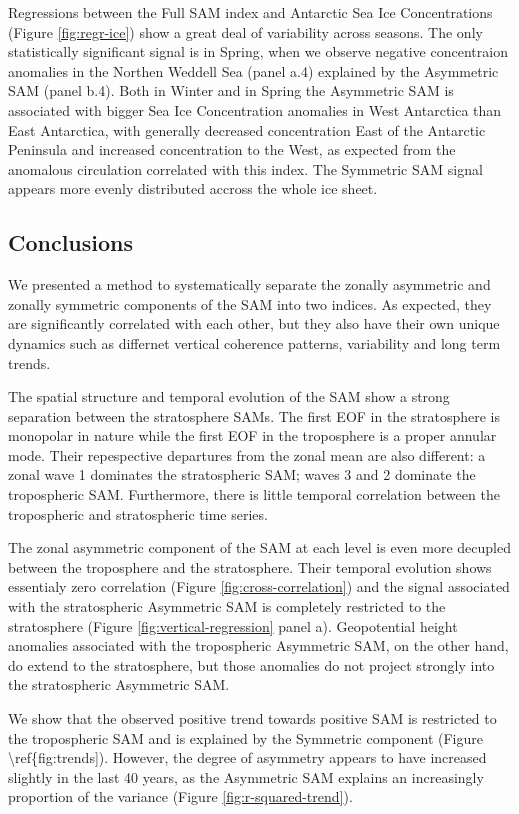 \documentclass[]{ametsocV5}
\begin{document}
Regressions between the Full SAM index and Antarctic Sea Ice
Concentrations (Figure \ref{fig:regr-ice}) show a great deal of
variability across seasons. The only statistically significant signal is
in Spring, when we observe negative concentraion anomalies in the
Northen Weddell Sea (panel a.4) explained by the Asymmetric SAM (panel
b.4). Both in Winter and in Spring the Asymmetric SAM is associated with
bigger Sea Ice Concentration anomalies in West Antarctica than East
Antarctica, with generally decreased concentration East of the Antarctic
Peninsula and increased concentration to the West, as expected from the
anomalous circulation correlated with this index. The Symmetric SAM
signal appears more evenly distributed accross the whole ice sheet.

\subsection{Conclusions}

We presented a method to systematically separate the zonally asymmetric
and zonally symmetric components of the SAM into two indices. As
expected, they are significantly correlated with each other, but they
also have their own unique dynamics such as differnet vertical coherence
patterns, variability and long term trends.

The spatial structure and temporal evolution of the SAM show a strong
separation between the stratosphere SAMs. The first EOF in the
stratosphere is monopolar in nature while the first EOF in the
troposphere is a proper annular mode. Their repespective departures from
the zonal mean are also different: a zonal wave 1 dominates the
stratospheric SAM; waves 3 and 2 dominate the tropospheric SAM.
Furthermore, there is little temporal correlation between the
tropospheric and stratospheric time series.

The zonal asymmetric component of the SAM at each level is even more
decupled between the troposphere and the stratosphere. Their temporal
evolution shows essentialy zero correlation (Figure
\ref{fig:cross-correlation}) and the signal associated with the
stratospheric Asymmetric SAM is completely restricted to the
stratosphere (Figure \ref{fig:vertical-regression} panel a).
Geopotential height anomalies associated with the tropospheric
Asymmetric SAM, on the other hand, do extend to the stratosphere, but
those anomalies do not project strongly into the stratospheric
Asymmetric SAM.

We show that the observed positive trend towards positive SAM is
restricted to the tropospheric SAM and is explained by the Symmetric
component (Figure \textbackslash{}ref\{fig:trends{]}). However, the
degree of asymmetry appears to have increased slightly in the last 40
years, as the Asymmetric SAM explains an increasingly proportion of the
variance (Figure \ref{fig:r-squared-trend}).
\end{document}

